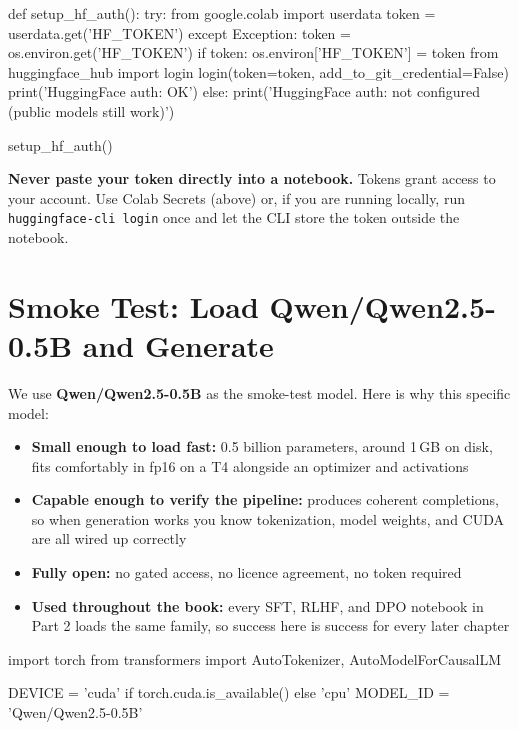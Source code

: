 \begin{chapterenv}
\begin{codeblock}[python]
def setup_hf_auth():
    try:
        from google.colab import userdata
        token = userdata.get('HF_TOKEN')
    except Exception:
        token = os.environ.get('HF_TOKEN')
    if token:
        os.environ['HF_TOKEN'] = token
        from huggingface_hub import login
        login(token=token, add_to_git_credential=False)
        print('HuggingFace auth: OK')
    else:
        print('HuggingFace auth: not configured (public models still work)')

setup_hf_auth()
\end{codeblock}

\begin{infobox}
\textbf{Never paste your token directly into a notebook.} Tokens grant access to your account. Use Colab Secrets (above) or, if you are running locally, run \texttt{huggingface-cli login} once and let the CLI store the token outside the notebook.
\end{infobox}

\section{Smoke Test: Load Qwen/Qwen2.5-0.5B and Generate}

We use \textbf{Qwen/Qwen2.5-0.5B} as the smoke-test model. Here is why this specific model:

\begin{itemize}[nosep]
    \item \textbf{Small enough to load fast:} 0.5 billion parameters, around 1\,GB on disk, fits comfortably in fp16 on a T4 alongside an optimizer and activations
    \item \textbf{Capable enough to verify the pipeline:} produces coherent completions, so when generation works you know tokenization, model weights, and CUDA are all wired up correctly
    \item \textbf{Fully open:} no gated access, no licence agreement, no token required
    \item \textbf{Used throughout the book:} every SFT, RLHF, and DPO notebook in Part 2 loads the same family, so success here is success for every later chapter
\end{itemize}

\begin{codeblock}[python]
import torch
from transformers import AutoTokenizer, AutoModelForCausalLM

DEVICE   = 'cuda' if torch.cuda.is_available() else 'cpu'
MODEL_ID = 'Qwen/Qwen2.5-0.5B'


\end{codeblock}
\end{chapterenv}
